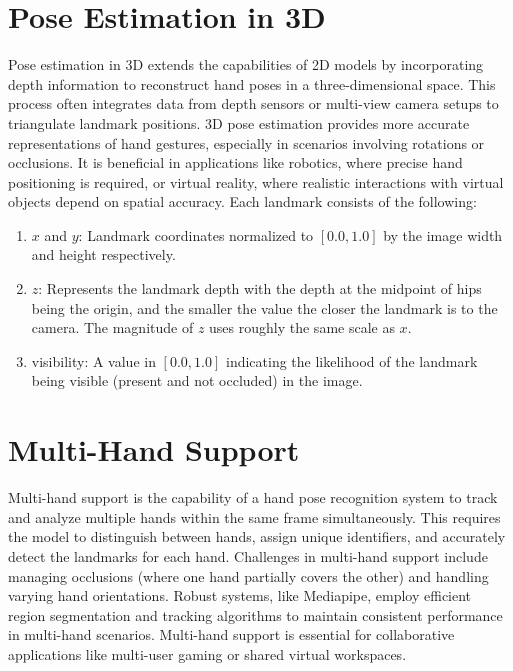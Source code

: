 \section{Pose Estimation in 3D}
Pose estimation in 3D extends the capabilities of 2D models by incorporating depth information to reconstruct hand poses in a three-dimensional space. This process often integrates data from depth sensors or multi-view camera setups to triangulate landmark positions. 3D pose estimation provides more accurate representations of hand gestures, especially in scenarios involving rotations or occlusions. It is beneficial in applications like robotics, where precise hand positioning is required, or virtual reality, where realistic interactions with virtual objects depend on spatial accuracy. Each landmark consists of the following:
\begin{enumerate}
	\item $x$ and $y$: Landmark coordinates normalized to $[0.0, 1.0]$ by the image width and height respectively.
	\item $z$: Represents the landmark depth with the depth at the midpoint of hips being the origin, and the smaller the value the closer the landmark is to the camera. The magnitude of $z$ uses roughly the same scale as $x$.
	\item visibility: A value in $[0.0, 1.0]$ indicating the likelihood of the landmark being visible (present and not occluded) in the image.
\end{enumerate}

\section{Multi-Hand Support}
Multi-hand support is the capability of a hand pose recognition system to track and analyze multiple hands within the same frame simultaneously. This requires the model to distinguish between hands, assign unique identifiers, and accurately detect the landmarks for each hand. Challenges in multi-hand support include managing occlusions (where one hand partially covers the other) and handling varying hand orientations. Robust systems, like Mediapipe, employ efficient region segmentation and tracking algorithms to maintain consistent performance in multi-hand scenarios. Multi-hand support is essential for collaborative applications like multi-user gaming or shared virtual workspaces.